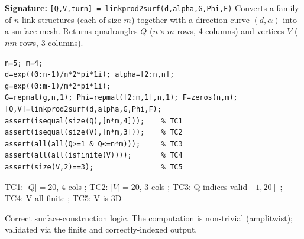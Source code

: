 \chapter{}
\begin{tcolorbox}[Abox,title={Analysis}]
\textbf{Signature:} \lstinline|[Q,V,turn] = linkprod2surf(d,alpha,G,Phi,F)|\quad
Converts a family of $n$ link structures (each of size $m$) together with a direction curve $(d,\alpha)$ into a surface mesh. Returns quadrangles $Q$ ($n\!\times\!m$ rows, 4 columns) and vertices $V$ ($nm$ rows, 3 columns).
\end{tcolorbox}
\begin{lstlisting}[caption={Tests for linkprod2surf.m}]
n=5; m=4;
d=exp((0:n-1)/n*2*pi*1i); alpha=[2:n,n];
g=exp((0:m-1)/m*2*pi*1i);
G=repmat(g,n,1); Phi=repmat([2:m,1],n,1); F=zeros(n,m);
[Q,V]=linkprod2surf(d,alpha,G,Phi,F);
assert(isequal(size(Q),[n*m,4]));    % TC1
assert(isequal(size(V),[n*m,3]));    % TC2
assert(all(all(Q>=1 & Q<=n*m)));     % TC3
assert(all(all(isfinite(V))));       % TC4
assert(size(V,2)==3);                % TC5
\end{lstlisting}
\begin{tcolorbox}[Pbox,title={TC1--TC5 -- All pass}]
TC1: $|Q|=20$, 4 cols \APROVADO; TC2: $|V|=20$, 3 cols \APROVADO; TC3: Q indices valid $[1,20]$ \APROVADO; TC4: V all finite \APROVADO; TC5: V is 3D \APROVADO
\end{tcolorbox}
\begin{concl}
Correct surface-construction logic. The  computation is non-trivial (amplitwist); validated via the finite and correctly-indexed output.
\end{concl}


